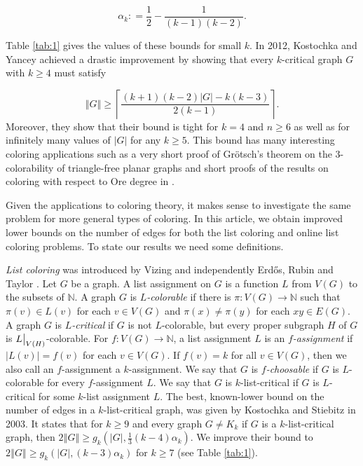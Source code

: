 \documentclass[12pt]{article}
\theoremstyle{plain}
\theoremstyle{definition}
\theoremstyle{remark}
\newcommand{\IN}{\mathbb{N}}
\newcommand{\card}[1]{\left|#1\right|}
\newcommand{\size}[1]{\left\Vert#1\right\Vert}
\newcommand{\ceil}[1]{\left\lceil#1\right\rceil}
\newcommand{\func}[3]{#1\colon #2 \rightarrow #3}
\newcommand{\DefinedAs}{\mathrel{\mathop:}=}
\newcommand\restr[2]{{%
  \left.\kern-\nulldelimiterspace %
  #1 %
  \vphantom{\big|} %
  \right|_{#2} %
  }}
\begin{document}
\[\alpha_k \DefinedAs \frac12 - \frac{1}{(k-1)(k-2)}.\]

Table \ref{tab:1} gives the values of these bounds for small $k$.  In 2012, Kostochka and Yancey \cite{kostochkayancey2012ore} achieved a drastic improvement by showing that every $k$-critical graph $G$ with $k \ge 4$ must satisfy

\[\size{G} \ge \ceil{\frac{(k+1)(k-2)\card{G} - k(k-3)}{2(k-1)}}.\]
Moreover, they show that their bound is tight for $k=4$ and $n \ge 6$ as well as for infinitely many values of $\card{G}$ for any $k \ge 5$.  This bound has many interesting coloring applications such as a very short proof of Gr\"otsch's theorem on the $3$-colorability of triangle-free planar graphs \cite{kostochka2012oregrotsch} and short proofs of the results on coloring with respect to Ore degree in \cite{kierstead2009ore, rabern2010a, krs_one}. 

Given the applications to coloring theory, it makes sense to investigate the same problem for more general types of coloring.  In this article, we obtain improved lower bounds on the number of edges for both the list coloring and online list coloring problems.  To state our results we need some definitions.

\emph{List coloring} was introduced by Vizing \cite{vizing1976} and independently Erd\H{o}s, Rubin and Taylor \cite{erdos1979choosability}.  Let $G$ be a graph. A list assignment on $G$ is a function $L$ from $V(G)$ to the subsets of $\IN$.   A graph $G$ is \emph{$L$-colorable} if there is $\func{\pi}{V(G)}{\IN}$ such that $\pi(v) \in L(v)$ for each $v \in V(G)$ and $\pi(x) \ne \pi(y)$ for each $xy \in E(G)$.   A graph $G$ is \emph{$L$-critical} if $G$ is not $L$-colorable, but every proper subgraph $H$ of $G$ is $\restr{L}{V(H)}$-colorable. For $\func{f}{V(G)}{\IN}$, a list assignment $L$ is an \emph{$f$-assignment} if $\card{L(v)} = f(v)$ for each $v \in V(G)$.  If $f(v) = k$ for all $v \in V(G)$, then we also call an $f$-assignment a $k$-assignment.  We say that $G$ is \emph{$f$-choosable} if $G$ is $L$-colorable for every $f$-assignment $L$.  
We say that $G$ is $k$-list-critical if $G$ is $L$-critical for some $k$-list assignment $L$. %
The best, known-lower bound on the number of edges in a $k$-list-critical graph, was given by Kostochka and Stiebitz \cite{kostochkastiebitzedgesincriticalgraph} in 2003. %
It states that for $k \ge 9$ and every graph $G \ne K_k$ if $G$ is a $k$-list-critical graph, then $2\size{G} \ge g_k(\card{G}, \frac13 (k-4)\alpha_k)$.  We improve their bound to $2\size{G} \ge g_k(\card{G}, (k-3)\alpha_k)$ for $k\ge7$ (see Table \ref{tab:1}).
\end{document}
